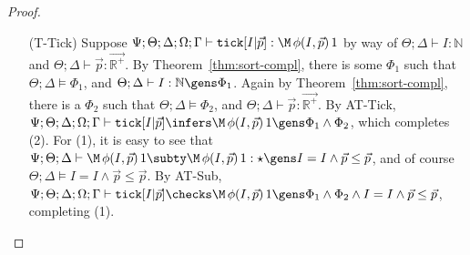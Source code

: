 \begin{proof}
\begin{itemize}
  
  \item[(T-Tick)] Suppose $\Psi ; \Theta ; \Delta ; \Omega ; \Gamma \vdash \texttt{tick}[I|\vec{p}] : \M \, \phi(I,\vec{p})\, 1$ by way of
  $\Theta ; \Delta \vdash I : \mathbb{N}$ and
  $\Theta ; \Delta \vdash \vec{p} : \vec{\mathbb{R}^+}$.
  By Theorem~\ref{thm:sort-compl}, there is some $\Phi_1$ such that
  $\Theta ; \Delta \vDash \Phi_1$, and
  $\Theta ; \Delta \vdash I : \mathbb{N} \gens \Phi_1$.
  Again by Theorem~\ref{thm:sort-compl}, there is a $\Phi_2$ such that
  $\Theta ; \Delta \vDash \Phi_2$, and
  $\Theta ; \Delta \vdash \vec{p} : \vec{\mathbb{R}^+}$.
  By AT-Tick,
  $\Psi ; \Theta ; \Delta ; \Omega ; \Gamma \vdash \texttt{tick}[I|\vec{p}] \infers \M \, \phi(I,\vec{p})\, 1 \gens \Phi_1 \wedge \Phi_2$,
  which completes (2).
  For (1), it is easy to see that $\Psi ; \Theta ; \Delta \vdash \M \, \phi(I,\vec{p})\, 1 \subty \M \, \phi(I,\vec{p})\, 1 : \star \gens I = I \wedge \vec{p} \leq \vec{p}$, and of course $\Theta ; \Delta \vDash I = I \wedge \vec{p} \leq \vec{p}$.
  By AT-Sub,
  $\Psi ; \Theta ; \Delta ; \Omega ; \Gamma \vdash \texttt{tick}[I|\vec{p}] \checks \M \, \phi(I,\vec{p})\, 1 \gens \Phi_1 \wedge \Phi_2 \wedge  I = I \wedge \vec{p} \leq \vec{p}$, completing (1).
  

\end{itemize}
\end{proof}
